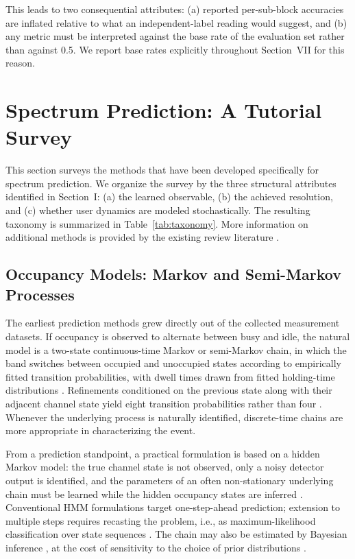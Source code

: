 \documentclass[lettersize,journal]{IEEEtran}
\begin{document}
This leads to two consequential attributes: (a) reported per-sub-block accuracies are
inflated relative to what an independent-label reading would suggest, 
and (b) any metric must be interpreted
against the base rate of the evaluation set rather than against 0.5.
We report base rates explicitly throughout Section~VII for this reason.

\section{\textbf{Spectrum Prediction: A Tutorial Survey}}

This section surveys the methods that have been developed specifically for
spectrum prediction.
We organize the survey by the three structural attributes identified in Section~I:
(a) the learned observable, (b) the achieved resolution, and
(c) whether user dynamics are modeled stochastically.
The resulting taxonomy is summarized in Table~\ref{tab:taxonomy}.
More information on additional methods is provided by the existing review
literature \cite{Yucek2009, He2010, Xing2013, Chen2016, Ding2018, Wang2024}.

\subsection{\textbf{Occupancy Models: Markov and Semi-Markov Processes}}
The earliest prediction methods grew directly out of the collected measurement
datasets.
If occupancy is observed to alternate between busy and idle,
the natural model is a two-state continuous-time Markov or semi-Markov
chain, in which the band switches between occupied and unoccupied states
according to empirically fitted transition probabilities, with dwell
times drawn from fitted holding-time distributions
\cite{Gibson1994, Percival1997}.
Refinements conditioned on the previous
state along with their adjacent channel state yield eight transition
probabilities rather than four \cite{Saad2016, Pan2026}.
Whenever the underlying process is naturally identified, discrete-time chains are
more appropriate in characterizing the event.

From a prediction standpoint, a practical formulation is based on a hidden
Markov model: the true channel state is not observed, only a noisy
detector output is identified, and the parameters of an often non-stationary
underlying chain must be learned while the hidden occupancy states are
inferred \cite{Chen2011, Akbar2007}.
Conventional HMM formulations target one-step-ahead prediction;
extension to multiple steps requires recasting the problem,
i.e., as maximum-likelihood classification over state sequences
\cite{Saad2016}. The chain may also be estimated by Bayesian inference
\cite{Xing2013b}, at the cost of sensitivity to the choice of prior
distributions \cite{Pan2026}.
\end{document}
